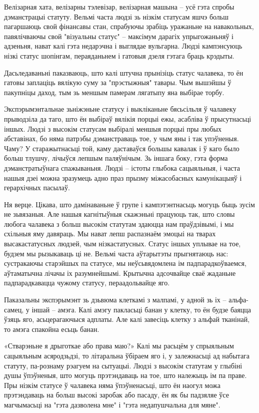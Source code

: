 Велізарная хата, велізарны тэлевізар, велізарная машына – усё гэта спробы дэманстрацыі статуту. Вельмі часта людзі зь нізкім статусам яшчэ больш пагаршаюць свой фінансавы стан, спрабуючы зрабіць уражаньне на навакольных, павялічваючы свой "візуальны статус" – максімум дарагіх упрыгожаньняў і адзеньня, нават калі гэта недарэчна і выглядае вульгарна. Людзі кампэнсуюць нізкі статус шопінгам, пераяданьнем і гатовыя дзеля гэтага браць крэдыты.

Дасьледаваньні паказваюць, што калі штучна прынізіць статус чалавека, то ён гатовы заплаціць вялікую суму за "прэстыжныя" тавары. Чым вышэйшы ў пакупніцы даход, тым зь меншым памерам лягатыпу яна выбірае торбу.

Экспэрымэнтальнае зьніжэньне статусу і выкліканьне бясьсільля ў чалавеку прыводзіла да таго, што ён выбіраў вялікія порцыі ежы, асабліва ў прысутнасьці іншых. Людзі з высокім статусам выбіралі меншыя порцыі пры любых абставінах, бо няма патрэбы дэманстраваць тое, у чым яны і так упэўненыя. Чаму? У старажытнасьці той, каму даставаўся большы кавалак і ў каго было больш тлушчу, лічыўся лепшым паляўнічым. Зь іншага боку, гэта форма дэманстратыўнага спажываньня. Людзі – істоты глыбока сацыяльныя, і часта нашыя дзеі можна зразумець адно праз прызму міжасобасных камунікацыяў і герархічных пасылаў.

Ня верце. Цікава, што дамінаваньне ў групе і кампэтэнтнасьць могуць быць зусім не зьвязаныя. Але нашыя кагнітыўныя скажэньні працуюць так, што словы любога чалавека з больш высокім статутам здаюцца нам праўдзівымі, і мы схільныя яму давяраць. Мы нават лепш распазнаём эмоцыі на тварах высакастатусных людзей, чым нізкастатусных. Статус іншых уплывае на тое, будзем мы рызыкаваць ці не. Вельмі часта аўтарытэты прыгнятаюць нас: сустракаючы старэйшых па статусе, мы неўсьвядомлена ім падпарадкоўваемся, аўтаматычна лічачы іх разумнейшымі. Крытычна адсочвайце сваё жаданьне падпарадкавацца чужому статусу, пераадольвайце яго.

Паказальны экспэрымэнт зь дзьвюма клеткамі з малпамі, у адной зь іх – альфа-самец, у іншай – амэга. Калі амэгу пакласьці банан у клетку, то ён будзе баяцца ўзяць яго, асьцерагаючыся адплаты. Але калі завесіць клетку з альфай тканінай, то амэга спакойна есьць банан.

«Стварэньне я дрыготкае або права маю?» Калі мы расьцём у спрыяльным сацыяльным асяродзьдзі, то літаральна ўбіраем яго і, у залежнасьці ад набытага статуту, па-рознаму рэагуем на сытуацыі. Людзі з высокім статутам у глыбіні душы ўпэўненыя, што могуць прэтэндаваць на тое, што належыць ім па праве. Пры нізкім статусе ў чалавека няма ўпэўненасьці, што ён наогул можа прэтэндаваць на больш высокі заробак або пасаду, ён як бы падзяляе ўсе магчымасьці на "гэта дазволена мне" і "гэта недапушчальна для мяне".

